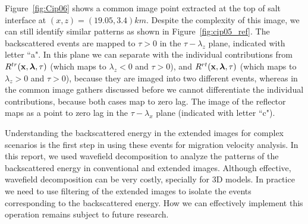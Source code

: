 Figure~\ref{fig:Cip06} shows a common image point extracted at the top of salt interface at $(x,z)=(19.05,3.4)km$. Despite the complexity of this image, we can still
identify similar patterns as shown in Figure~\ref{fig:cip05_ref}. The backscattered events are mapped to $\tau>0$ in the
$\tau-\lambda_z$ plane, indicated with letter ``a". In this plane we can separate with the individual contributions 
from $R^{tr}({\bf x},{\boldsymbol{\lambda}},\tau)$ (which maps to $\lambda_z<0$ and $\tau>0$), and $R^{rt}({\bf x},{\boldsymbol{\lambda}},\tau)$ (which maps to $\lambda_z>0$ and $\tau>0$), because they are imaged into two different events, 
whereas in the common image gathers discussed before we cannot differentiate the individual
contributions, because both cases map to zero lag. The image of the reflector maps as a point to zero lag in the $\tau-\lambda_x$ plane (indicated with letter ``c"). 

Understanding the backscattered energy in the extended images for complex scenarios is the first step in using these events for 
migration velocity analysis. In this report, we used wavefield decomposition to analyze the patterns of the backscattered energy in conventional and extended images.
 Although effective, wavefield decomposition can be very costly, specially for 3D models. In practice we need to use filtering of the extended images to isolate the events corresponding to 
the backscattered energy. How we can effectively  implement this operation remains subject to future research.





